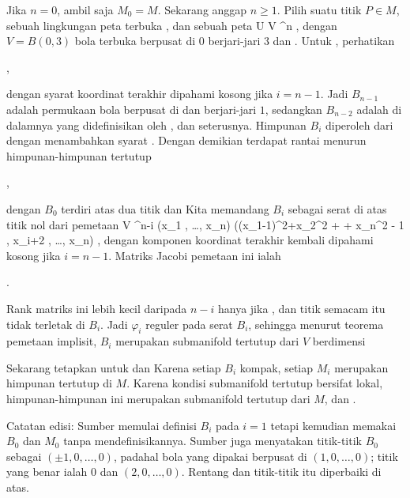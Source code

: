 Jika $n=0$, ambil saja $M_0=M$. Sekarang anggap $n\geq1$. Pilih suatu titik $P\in M$, sebuah lingkungan peta terbuka
,
dan sebuah peta
\maabbdisp {\alpha} { U } {V \subseteq \R^n
} {,}
dengan $V=B(0,3)$ bola terbuka berpusat di $0$ berjari-jari $3$ dan
.
Untuk
, perhatikan

 { , }

dengan syarat koordinat terakhir dipahami kosong jika $i=n-1$.
Jadi $B_{n-1}$ adalah permukaan bola berpusat di
dan berjari-jari $1$, sedangkan $B_{n-2}$ adalah
di dalamnya yang didefinisikan oleh
, dan seterusnya. Himpunan $B_i$ diperoleh dari
dengan menambahkan syarat
.
Dengan demikian terdapat rantai menurun himpunan-himpunan tertutup

 { , }

dengan $B_0$ terdiri atas dua titik
dan
Kita memandang $B_i$ sebagai serat di atas titik nol dari pemetaan
 { V } {\R^{n-i}
} {(x_1 , \ldots , x_n) } {  ((x_1-1)^2+x_2^2 + \cdots + x_n^2 - 1 , x_{i+2} , \ldots , x_n)
} {,}
dengan komponen koordinat terakhir kembali dipahami kosong jika $i=n-1$.
Matriks Jacobi pemetaan ini ialah

 { . }

Rank matriks ini lebih kecil daripada $n-i$ hanya jika
,
dan titik semacam itu tidak terletak di $B_i$. Jadi $\varphi_i$ reguler pada serat $B_i$, sehingga menurut teorema pemetaan implisit, $B_i$ merupakan submanifold tertutup dari $V$ berdimensi

Sekarang tetapkan
untuk
dan
Karena setiap $B_i$ kompak, setiap $M_i$ merupakan himpunan tertutup di $M$. Karena kondisi submanifold tertutup bersifat lokal, himpunan-himpunan ini merupakan submanifold tertutup dari $M$, dan
.

Catatan edisi: Sumber memulai definisi $B_i$ pada $i=1$ tetapi kemudian memakai $B_0$ dan $M_0$ tanpa mendefinisikannya. Sumber juga menyatakan titik-titik $B_0$ sebagai $(\pm1,0,\ldots,0)$, padahal bola yang dipakai berpusat di $(1,0,\ldots,0)$; titik yang benar ialah $0$ dan $(2,0,\ldots,0)$. Rentang dan titik-titik itu diperbaiki di atas.
